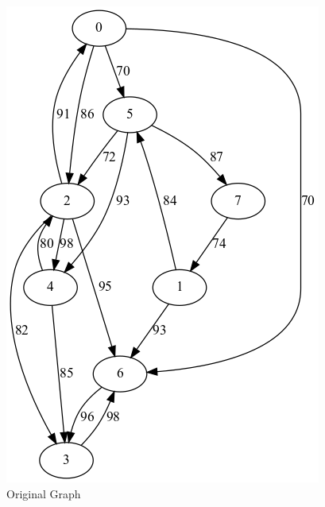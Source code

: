 \documentclass{article}
\begin{document}
\begin{figure}[!htb]
  \includegraphics[width=\linewidth]{"./output/scc_example.png"}
  \caption{Original Graph}
\endminipage\hfill
{}

\end{figure}
\end{document}
